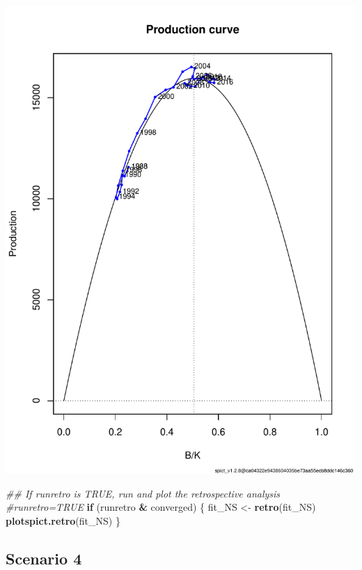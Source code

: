 \documentclass[
]{article}
\newenvironment{Shaded}{\begin{snugshade}}{\end{snugshade}}
\newcommand{\CommentTok}[1]{\textcolor[rgb]{0.56,0.35,0.01}{\textit{#1}}}
\newcommand{\ControlFlowTok}[1]{\textcolor[rgb]{0.13,0.29,0.53}{\textbf{#1}}}
\newcommand{\KeywordTok}[1]{\textcolor[rgb]{0.13,0.29,0.53}{\textbf{#1}}}
\newcommand{\NormalTok}[1]{#1}
\newcommand{\OperatorTok}[1]{\textcolor[rgb]{0.81,0.36,0.00}{\textbf{#1}}}
\newcommand{\StringTok}[1]{\textcolor[rgb]{0.31,0.60,0.02}{#1}}
\begin{document}
\includegraphics{aru.27.123a4_SPiCT_WD_files/figure-latex/diagnostics_scenario_3-2.pdf}

\begin{Shaded}
\begin{Highlighting}[]
  \CommentTok{## If runretro is TRUE, run and plot the retrospective analysis}
  \CommentTok{#runretro=TRUE}
\ControlFlowTok{if}\NormalTok{ (runretro }\OperatorTok{&}\StringTok{ }\NormalTok{converged) \{}
\NormalTok{    fit_NS <-}\StringTok{ }\KeywordTok{retro}\NormalTok{(fit_NS)}
    \KeywordTok{plotspict.retro}\NormalTok{(fit_NS)}
\NormalTok{  \}}
\end{Highlighting}
\end{Shaded}

\hypertarget{scenario-4}{%
\subsection{Scenario 4}\label{scenario-4}}
\end{document}
